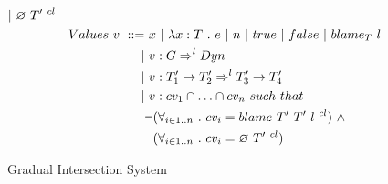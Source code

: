 \documentclass[a4paper]{article}
\begin{document}
\begin{figure}[H]
\begin{align*}
\begin{aligned}[t]
                                       |&\ \emptycast{T'}{cl} \end{aligned}\\
&Values\ \begin{aligned}[t] v\ ::=&\ x\ |\ \lambda x : T\ .\ e\ |\ n\ |\ \true\ |\ \false\ |\ \blame{T}{l}\\
                                 |&\ v : G \Rightarrow^l \Dyn\\
                                 |&\ v : T'_1 \rightarrow T'_2 \Rightarrow^l T'_3 \rightarrow T'_4\\
                                 |&\ v : cv_1 \cap \ldots \cap cv_n\ such\ that\\
                                 &\neg(\forall_{i\in 1..n}\ .\ cv_i = \blamecast{T'}{T'}{l}{cl})\ \land\\
                                 &\neg(\forall_{i\in 1..n}\ .\ cv_i = \emptycast{T'}{cl}) \end{aligned}
\end{align*}
\hrulefill
\caption{Gradual Intersection System}
\label{intersection_syntax}
\end{figure}
\end{document}
